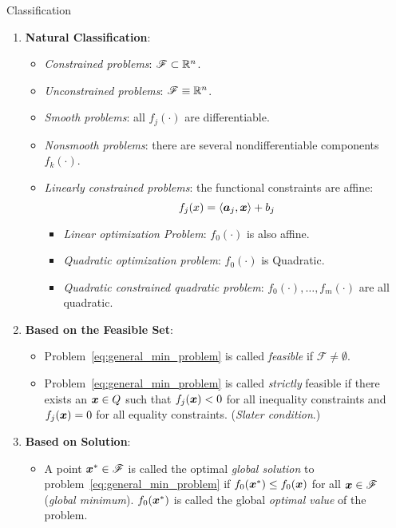 \begin{note}{Classification}
    \begin{enumerate}
        \item \textbf{Natural Classification}:
            \begin{itemize}
                \item \emph{Constrained problems}: \(\mathscr{F} \subset \mathbb{R}^n\).
                \item \emph{Unconstrained problems}: \(\mathscr{F} \equiv \mathbb{R}^n\).
                \item \emph{Smooth problems}: all \(f_j(\cdot)\) are differentiable.
                \item \emph{Nonsmooth problems}: there are several nondifferentiable components \(f_k(\cdot)\).
                \item \emph{Linearly constrained problems}: the functional constraints are affine:
                    \[
                            f_j(x) = \langle \boldsymbol{a}_j, \boldsymbol{x} \rangle + b_j
                    \]
                    \begin{itemize}
                        \item \emph{Linear optimization Problem}: \(f_0(\cdot)\) is also affine.
                        \item \emph{Quadratic optimization problem}: \(f_0(\cdot)\) is Quadratic.
                        \item \emph{Quadratic constrained quadratic problem}: \(f_0(\cdot), \dots, f_m(\cdot)\) are all quadratic.
                    \end{itemize}
            \end{itemize}
        \item \textbf{Based on the Feasible Set}:
            \begin{itemize}
                \item Problem~\ref{eq:general_min_problem} is called \emph{feasible} if \(\mathscr{F} \ne \emptyset\).
                \item Problem~\ref{eq:general_min_problem} is called \emph{strictly} feasible if there exists an \(\boldsymbol{x} \in Q\) such that \(f_j(\boldsymbol{x}) < 0\) for all inequality constraints and \(f_j(\boldsymbol{x}) = 0\) for all equality constraints. (\textit{Slater condition}.)
            \end{itemize}
        \item \textbf{Based on Solution}:
            \begin{itemize}
                \item A point \(\boldsymbol{x}^* \in \mathscr{F}\) is called the optimal \emph{global solution} to problem~\ref{eq:general_min_problem} if \(f_0(\boldsymbol{x}^*) \le f_0(\boldsymbol{x})\) for all \(\boldsymbol{x} \in \mathscr{F}\) (\textit{global minimum}). \(f_0(\boldsymbol{x}^*)\) is called the global \emph{optimal value} of the problem.

\end{itemize}
\end{enumerate}
\end{note}
